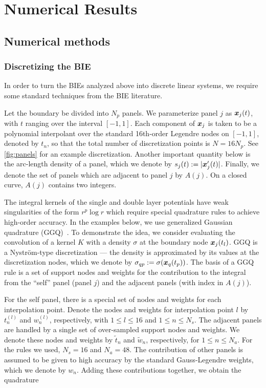 \section{Numerical Results}
\label{sec:numerical}

\subsection{Numerical methods}

\subsubsection{Discretizing the BIE}

In order to turn the BIEs analyzed
above into discrete linear systems,
we require some standard techniques
from the BIE literature.

Let the boundary be divided into $N_p$
panels.
%
We parameterize panel $j$ as
${\boldsymbol x}_j(t)$, with $t$ ranging over the
interval $[-1,1]$.
%
Each component of ${\boldsymbol x}_j$ is taken to be
a polynomial interpolant over the
standard 16th-order Legendre nodes on
$[-1,1]$, denoted by $t_n$, so that
the total number of discretization
points is $N=16N_p$.
%
See \cref{fig:panels} for an example
discretization.
%
Another important quantity below is the
arc-length density of a panel, which
we denote by $s_j(t) := |{\boldsymbol x}'_j(t)|$.
%
Finally, we denote the set of panels
which are adjacent to panel $j$
by $A(j)$. On a closed curve,
$A(j)$ contains two integers.

The integral kernels of the single and
double layer potentials have weak
singularities of the form $r^p\log r$
which require special quadrature rules to
achieve high-order accuracy.
%
In the examples below, we use generalized
Gaussian quadrature (GGQ)~\cite{bremer2010}.
%
To demonstrate the idea, we consider
evaluating the convolution of a kernel
$K$ with a density $\sigma$
at the boundary node ${\boldsymbol x}_j(t_l)$.
%
GGQ is a Nystr\"{o}m-type discretization ---
the density is approximated 
by its values at the discretization nodes,
which we denote by
$\sigma_{qp} := \sigma({\boldsymbol x}_q(t_p))$.
%
The basis of a GGQ rule is a set of 
support nodes and weights for the
contribution to the integral from the
``self'' panel (panel $j$) and the adjacent
panels (with index in $A(j)$).
%

For the self panel, there is a special set
of nodes and weights for each interpolation
point. Denote the nodes and weights
for interpolation point $l$ by $t^{(l)}_{n}$
and $w^{(l)}_{n}$, respectively, with
$1\leq l \leq 16$ and $1\leq n \leq N_s$.
%
The adjacent panels are handled by a single
set of over-sampled support nodes and weights.
We denote these nodes and weights
by $\tilde{t}_n$ and $\tilde{w}_n$, respectively,
for $1 \leq n \leq N_a$.
%
For the rules we used, $N_s = 16$ and
$N_a = 48$.
%
The contribution of other panels is assumed
to be given to high accuracy by the standard
Gauss-Legendre weights, which we denote
by $w_n$.
%
Adding these contributions together, we obtain the
quadrature

